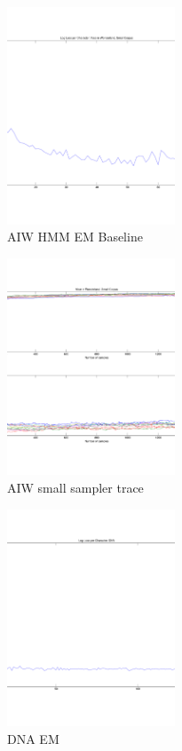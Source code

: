 \begin{figure}[htbp]
\begin{center}
\includegraphics[width=5cm]{results/aiw_small_hmm_baseline}
\caption{AIW HMM EM Baseline}
\label{fig:aiw_hmm_baseline}
\end{center}
\end{figure}

\begin{figure}[htbp]
\begin{center}
\includegraphics[width=5cm]{results/aiw_small_sampler_trace}
\caption{AIW small sampler trace }
\label{fig:aiw_small_sampler_trace}
\end{center}
\end{figure}

\begin{figure}[htbp]
\begin{center}
\includegraphics[width=5cm]{results/dna_hmm_baseline}
\caption{DNA EM }
\label{fig:dna_hmm_baseline}
\end{center}
\end{figure}


